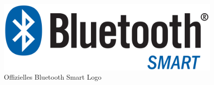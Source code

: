 \begin{figure}[H]
\centering
\includegraphics[scale=0.07]{Bilder/BLE.png} 
\caption{Offizielles Bluetooth Smart Logo \cite{BLElogo}}
\label{BLElogo}
\end{figure}
%
\newpage
